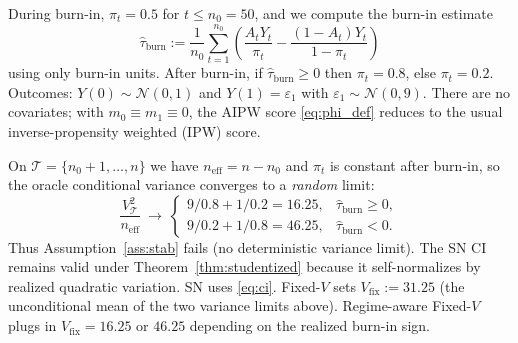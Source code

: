 \documentclass[11pt]{article}
\numberwithin{equation}{section}
\theoremstyle{plain}
\theoremstyle{definition}
\theoremstyle{remark}
\begin{document}
During burn-in, $\pi_t=0.5$ for $t\le n_0=50$, and we compute the burn-in estimate
\[
\widehat\tau_{\mathrm{burn}}
:=\frac{1}{n_0}\sum_{t=1}^{n_0}\left(\frac{A_tY_t}{\pi_t}-\frac{(1-A_t)Y_t}{1-\pi_t}\right)
\]
using only burn-in units. After burn-in, if $\widehat\tau_{\mathrm{burn}}\ge 0$ then $\pi_t=0.8$, else $\pi_t=0.2$. Outcomes: $Y(0)\sim\mathcal{N}(0,1)$ and $Y(1)=\varepsilon_1$ with $\varepsilon_1\sim\mathcal{N}(0,9)$. There are no covariates; with $m_0\equiv m_1\equiv 0$, the AIPW score \eqref{eq:phi_def} reduces to the usual inverse-propensity weighted (IPW) score.

On $\mathcal{T}=\{n_0+1,\dots,n\}$ we have $n_{\mathrm{eff}}=n-n_0$ and $\pi_t$ is constant after burn-in, so the oracle conditional variance converges to a \emph{random} limit:
\[
\frac{V_{\mathcal{T}}^2}{n_{\mathrm{eff}}}\ \to\
\begin{cases}
9/0.8 + 1/0.2 = 16.25, & \widehat\tau_{\mathrm{burn}}\ge 0,\\
9/0.2 + 1/0.8 = 46.25, & \widehat\tau_{\mathrm{burn}}<0.
\end{cases}
\]
Thus Assumption~\ref{ass:stab} fails (no deterministic variance limit). The SN CI remains valid under Theorem~\ref{thm:studentized} because it self-normalizes by realized quadratic variation. SN uses \eqref{eq:ci}. Fixed-$V$ sets $V_{\mathrm{fix}}:=31.25$ (the unconditional mean of the two variance limits above). Regime-aware Fixed-$V$ plugs in $V_{\mathrm{fix}}=16.25$ or $46.25$ depending on the realized burn-in sign.
\end{document}
